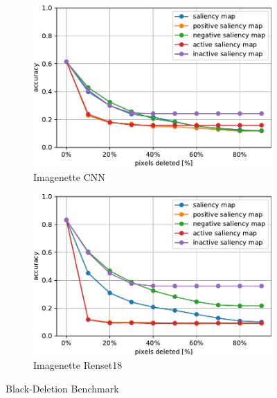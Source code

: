 \documentclass[preprint,12pt]{elsarticle}
\begin{document}
\begin{figure}
\begin{subfigure}{0.49\textwidth}
        \includegraphics[width=\linewidth]{../visualizations/benchmarks/black_deletion/imagenette_cnn.pdf}
        \caption{Imagenette CNN}
    \end{subfigure}
    \hfill
    \begin{subfigure}{0.49\textwidth}
        \centering
        \includegraphics[width=\linewidth]{../visualizations/benchmarks/black_deletion/imagenette_resnet18.pdf}
        \caption{Imagenette Renset18}
    \end{subfigure}
    \caption{Black-Deletion Benchmark}
    \label{fig: black-deletion benchmark}
\end{figure}
\end{document}
